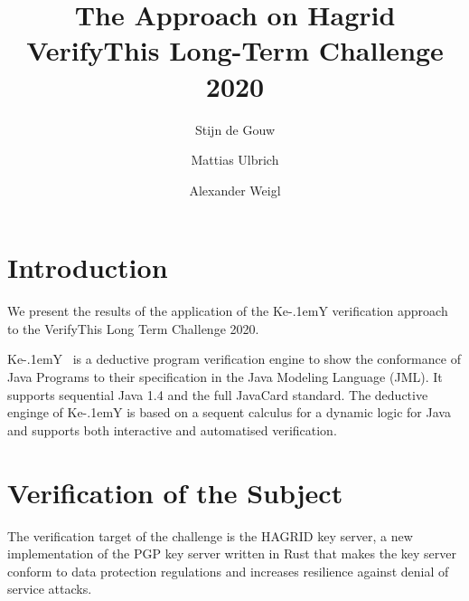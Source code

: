 \documentclass{llncs}
\title{The \KeY Approach on Hagrid
  \\{\small VerifyThis Long-Term Challenge 2020 }}
\author{ Stijn de Gouw \and Mattias Ulbrich \and Alexander Weigl }
\institute{Open University \and Karlsruhe Institute of Technology}
\newcommand{\KeY}{Ke\kern-.1emY\xspace}
\begin{document}
\maketitle

\section{Introduction}

We present the results of the application of the \KeY verification
approach to the VerifyThis Long Term Challenge 2020. 



\KeY~\cite{KeYBook2} is a deductive program verification engine to
show the conformance of Java Programs to their specification in the
Java Modeling Language (JML). It supports sequential Java 1.4 and the
full JavaCard  standard.
%
The deductive enginge of \KeY is based on a sequent calculus for a
dynamic logic for Java and supports both interactive and automatised
verification.


\section{Verification of the Subject}
The verification target of the challenge is the HAGRID key server, a
new implementation of the PGP key server written in Rust that makes
the key server conform to data protection regulations and increases
resilience against denial of service attacks.
\end{document}
